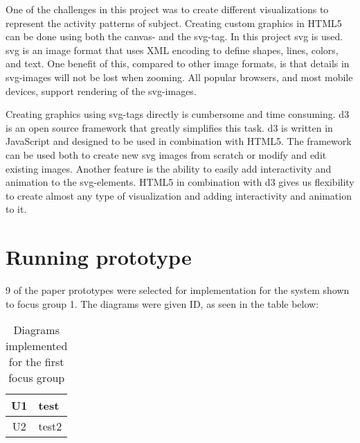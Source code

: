 One of the challenges in this project was to create different visualizations to represent the activity patterns of subject. Creating custom graphics in HTML5 can be done using both the canvas- and the svg-tag. In this project \gls{svg} is used. \gls{svg} is an image format that uses XML encoding to define shapes, lines, colors, and text. One benefit of this, compared to other image formats, is that details in \gls{svg}-images will not be lost when zooming. All popular browsers, and most mobile devices, support rendering of the \gls{svg}-images.

Creating graphics using svg-tags directly is cumbersome and time consuming. \gls{d3} is an open source framework that greatly simplifies this task. \gls{d3} is written in JavaScript and designed to be used in combination with HTML5. The framework can be used both to create new \gls{svg} images from scratch or modify and edit existing images. Another feature is the ability to easily add interactivity and animation to the \gls{svg}-elements. HTML5 in combination with \gls{d3} gives us flexibility to create almost any type of visualization and adding interactivity and animation to it.

\section{Running prototype}
9 of the paper prototypes were selected for implementation for the system shown to focus group 1. The diagrams were given ID, as seen in the table below:
\begin{table}[h!]
  \begin{tabular}{|c|p{10cm}|}
    \hline
    U1 & test \\ \hline
    U2 & test2 \\ \hline
  \end{tabular}
  \caption{Diagrams implemented for the first focus group}
\end{table}
